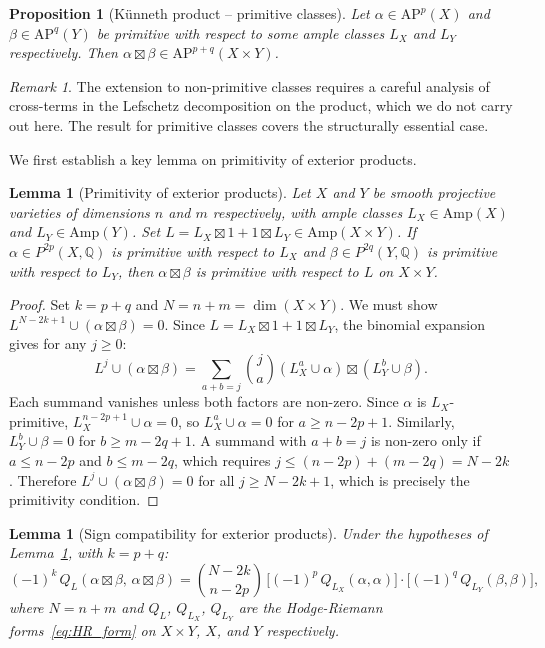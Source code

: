 \documentclass[aps,prd,twocolumn,superscriptaddress,nofootinbib]{revtex4-2}
\newtheorem{proposition}[theorem]{Proposition}
\newtheorem{lemma}[theorem]{Lemma}
\theoremstyle{definition}
\theoremstyle{remark}
\newtheorem{remark}[theorem]{Remark}
\begin{document}
\begin{proposition}[K\"unneth product -- primitive classes]
\label{prop:kunneth}
Let $\alpha \in \mathrm{AP}^p(X)$ and $\beta \in \mathrm{AP}^q(Y)$ be primitive with respect to some ample classes $L_X$ and $L_Y$ respectively. Then $\alpha \boxtimes \beta \in \mathrm{AP}^{p+q}(X \times Y)$.
\end{proposition}

\begin{remark}
The extension to non-primitive classes requires a careful analysis of cross-terms in the Lefschetz decomposition on the product, which we do not carry out here. The result for primitive classes covers the structurally essential case.
\end{remark}

We first establish a key lemma on primitivity of exterior products.

\begin{lemma}[Primitivity of exterior products]
\label{lem:primitive_product}
Let $X$ and $Y$ be smooth projective varieties of dimensions $n$ and $m$ respectively, with ample classes $L_X \in \mathrm{Amp}(X)$ and $L_Y \in \mathrm{Amp}(Y)$. Set $L = L_X \boxtimes 1 + 1 \boxtimes L_Y \in \mathrm{Amp}(X \times Y)$. If $\alpha \in P^{2p}(X, \mathbb{Q})$ is primitive with respect to $L_X$ and $\beta \in P^{2q}(Y, \mathbb{Q})$ is primitive with respect to $L_Y$, then $\alpha \boxtimes \beta$ is primitive with respect to $L$ on $X \times Y$.
\end{lemma}

\begin{proof}
Set $k = p + q$ and $N = n + m = \dim(X \times Y)$. We must show $L^{N-2k+1} \cup (\alpha \boxtimes \beta) = 0$. Since $L = L_X \boxtimes 1 + 1 \boxtimes L_Y$, the binomial expansion gives for any $j \geq 0$:
\[
L^j \cup (\alpha \boxtimes \beta) = \sum_{a+b=j} \binom{j}{a} (L_X^a \cup \alpha) \boxtimes (L_Y^b \cup \beta).
\]
Each summand vanishes unless both factors are non-zero. Since $\alpha$ is $L_X$-primitive, $L_X^{n-2p+1} \cup \alpha = 0$, so $L_X^a \cup \alpha = 0$ for $a \geq n - 2p + 1$. Similarly, $L_Y^b \cup \beta = 0$ for $b \geq m - 2q + 1$. A summand with $a + b = j$ is non-zero only if $a \leq n - 2p$ and $b \leq m - 2q$, which requires $j \leq (n - 2p) + (m - 2q) = N - 2k$. Therefore $L^j \cup (\alpha \boxtimes \beta) = 0$ for all $j \geq N - 2k + 1$, which is precisely the primitivity condition.
\end{proof}

\begin{lemma}[Sign compatibility for exterior products]
\label{lem:sign_product}
Under the hypotheses of Lemma~\ref{lem:primitive_product}, with $k = p + q$:
\begin{equation}
(-1)^k\, Q_L(\alpha \boxtimes \beta,\, \alpha \boxtimes \beta) = \binom{N-2k}{n-2p}\, \bigl[(-1)^p\, Q_{L_X}(\alpha, \alpha)\bigr] \cdot \bigl[(-1)^q\, Q_{L_Y}(\beta, \beta)\bigr],
\label{eq:sign_kunneth}
\end{equation}
where $N = n + m$ and $Q_L$, $Q_{L_X}$, $Q_{L_Y}$ are the Hodge-Riemann forms~\eqref{eq:HR_form} on $X \times Y$, $X$, and $Y$ respectively.
\end{lemma}
\end{document}
